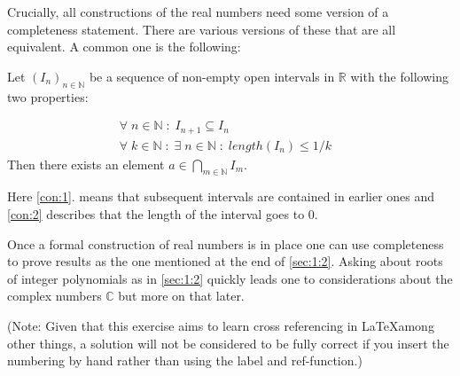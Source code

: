 \documentclass{article}
\newcommand{\R}{\mathbb{R}}
\newcommand{\N}{\mathbb{N}}
\newcommand{\C}{\mathbb{C}}
\begin{document}
Crucially, all constructions of the real numbers need some version of a completeness statement. There are various versions of these that are all equivalent. A common one is the following:

Let $(I_n)_{n\in\N}$  be a sequence of non-empty open intervals in $\R$ with the following two properties:

\begin{align}\label{con:1}
    \forall\;n\in\N\;:\;I_{n+1}\subseteq I_n&\\
    \label{con:2}
    \forall\;k\in\N\;:\;\exists\;n\in\N\;:\;length(I_n)\leq1/k&
\end{align}
Then there exists an element $a\in\bigcap\limits_{m\in\N}I_m$.

Here \cref{con:1}. means that subsequent intervals are contained in earlier ones and \cref{con:2} describes that the length of the interval goes to $0$.

Once a formal construction of real numbers is in place one can use completeness to prove results as the one mentioned at the end of \cref{sec:1:2}. Asking about roots of integer polynomials as in \cref{sec:1:2} quickly leads one to considerations about the complex numbers $\C$ but more on that later.
\bigskip

(Note: Given that this exercise aims to learn cross referencing in \LaTeX among other things, a solution will not be considered to be fully correct if you insert the numbering by hand rather than using the label and ref-function.)
\end{document}
